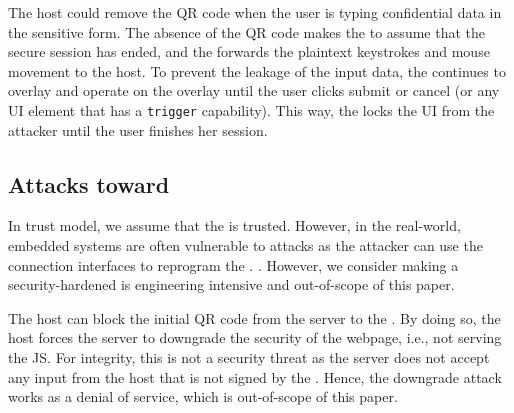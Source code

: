 \parasave
{} The host could remove the QR code when the user is typing confidential data in the sensitive form. The absence of the QR code makes the \device to assume that the secure session has ended, and the \device forwards the plaintext keystrokes and mouse movement to the host. To prevent the leakage of the input data, the \device continues to overlay and operate on the overlay until the user clicks submit or cancel (or any UI element that has a \texttt{trigger}  capability). This way, the \device locks the UI from the attacker until the user finishes her session.

\subsection{Attacks toward \device} 
\label{sec:securityAnalysis:device}

In \name trust model, we assume that the \device is trusted. However, in the real-world, embedded systems are often vulnerable to attacks as the attacker can use the connection interfaces to reprogram the \device. . However, we consider making a security-hardened \device is engineering intensive and out-of-scope of this paper. 

\parasave
{} The host can block the initial QR code from the server to the \device. By doing so, the host forces the server to downgrade the security of the webpage, i.e., not serving the \name JS. For integrity, this is not a security threat as the server does not accept any input from the host that is not signed by the \device. Hence, the downgrade attack works as a denial of service, which is out-of-scope of this paper.

